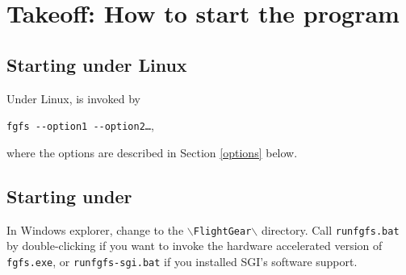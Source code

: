 

\chapter{Takeoff: How to start the program\label{takeoff}}

\section{Starting under Linux}
Under Linux, \FlightGear is invoked by

  \texttt{fgfs -$\!$-option1 -$\!$-option2\dots},

\noindent
 where the options are described in Section \ref{options} below.

\section{Starting under }

In Windows explorer, change to the \texttt{$\backslash$FlightGear$\backslash$} directory.
Call \texttt{runfgfs.bat} by double-clicking if you want to invoke the hardware
accelerated version of \FlightGear \texttt{fgfs.exe}, or \texttt{runfgfs-sgi.bat} if you
installed SGI's software  support.

